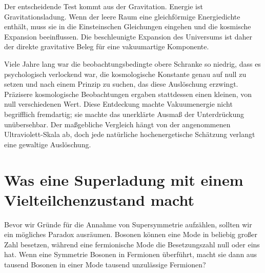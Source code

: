 Der entscheidende Test kommt aus der Gravitation. Energie ist Gravitationsladung. Wenn der leere Raum eine gleichförmige Energiedichte enthält, muss sie in die Einsteinschen Gleichungen eingehen und die kosmische Expansion beeinflussen. Die beschleunigte Expansion des Universums ist daher der direkte gravitative Beleg für eine vakuumartige Komponente.

\begin{classroomqa}
\end{classroomqa}

Viele Jahre lang war die beobachtungsbedingte obere Schranke so niedrig, dass es psychologisch verlockend war, die kosmologische Konstante genau auf null zu setzen und nach einem Prinzip zu suchen, das diese Auslöschung erzwingt. Präzisere kosmologische Beobachtungen ergaben stattdessen einen kleinen, von null verschiedenen Wert. Diese Entdeckung machte Vakuumenergie nicht begrifflich fremdartig; sie machte das unerklärte Ausmaß der Unterdrückung unübersehbar. Der maßgebliche Vergleich hängt von der angenommenen Ultraviolett-Skala ab, doch jede natürliche hochenergetische Schätzung verlangt eine gewaltige Auslöschung.

\section{Was eine Superladung mit einem Vielteilchenzustand macht}

Bevor wir Gründe für die Annahme von Supersymmetrie aufzählen, sollten wir ein mögliches Paradox ausräumen. Bosonen können eine Mode in beliebig großer Zahl besetzen, während eine fermionische Mode die Besetzungszahl null oder eins hat. Wenn eine Symmetrie Bosonen in Fermionen überführt, macht sie dann aus tausend Bosonen in einer Mode tausend unzulässige Fermionen?

